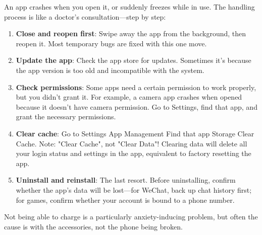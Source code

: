 
An app crashes when you open it, or suddenly freezes while in use. The handling process is like a doctor's consultation—step by step:

\begin{enumerate}
  \item \textbf{Close and reopen first}: Swipe away the app from the background, then reopen it. Most temporary bugs are fixed with this one move.
  \item \textbf{Update the app}: Check the app store for updates. Sometimes it's because the app version is too old and incompatible with the system.
  \item \textbf{Check permissions}: Some apps need a certain permission to work properly, but you didn't grant it. For example, a camera app crashes when opened because it doesn't have camera permission. Go to Settings, find that app, and grant the necessary permissions.
  \item \textbf{Clear cache}: Go to Settings App Management Find that app Storage Clear Cache. Note: "Clear Cache", not "Clear Data"! Clearing data will delete all your login status and settings in the app, equivalent to factory resetting the app.
  \item \textbf{Uninstall and reinstall}: The last resort. Before uninstalling, confirm whether the app's data will be lost—for WeChat, back up chat history first; for games, confirm whether your account is bound to a phone number.
\end{enumerate}


Not being able to charge is a particularly anxiety-inducing problem, but often the cause is with the accessories, not the phone being broken.

